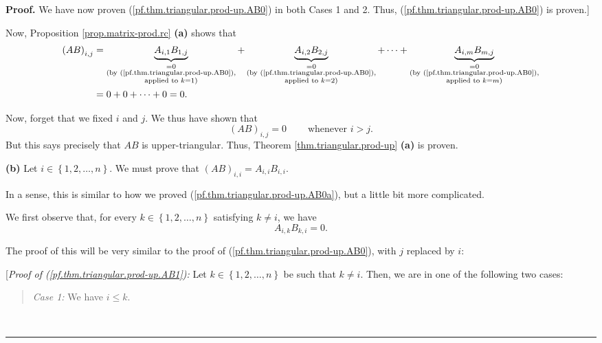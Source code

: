 \documentclass[numbers=enddot,12pt,final,onecolumn,notitlepage]{scrartcl}%
\theoremstyle{definition}
\newenvironment{statement}{\begin{quote}}{\end{quote}}
\newenvironment{proof}[1][Proof]{\noindent\textbf{#1.} }{\ \rule{0.5em}{0.5em}}
\begin{document}
\begin{proof}
We have now proven (\ref{pf.thm.triangular.prod-up.AB0}) in both Cases 1 and
2. Thus, (\ref{pf.thm.triangular.prod-up.AB0}) is proven.]

Now, Proposition \ref{prop.matrix-prod.rc} \textbf{(a)} shows that%
\begin{align*}
\left(  AB\right)  _{i,j}  &  =\underbrace{A_{i,1}B_{1,j}}%
_{\substack{=0\\\text{(by (\ref{pf.thm.triangular.prod-up.AB0}),}%
\\\text{applied to }k=1\text{)}}}+\underbrace{A_{i,2}B_{2,j}}%
_{\substack{=0\\\text{(by (\ref{pf.thm.triangular.prod-up.AB0}),}%
\\\text{applied to }k=2\text{)}}}+\cdots+\underbrace{A_{i,m}B_{m,j}%
}_{\substack{=0\\\text{(by (\ref{pf.thm.triangular.prod-up.AB0}),}%
\\\text{applied to }k=m\text{)}}}\\
&  =0+0+\cdots+0=0.
\end{align*}


Now, forget that we fixed $i$ and $j$. We thus have shown that%
\begin{equation}
\left(  AB\right)  _{i,j}=0\ \ \ \ \ \ \ \ \ \ \text{whenever }i>j.
\label{pf.thm.triangular.prod-up.AB0a}%
\end{equation}
But this says precisely that $AB$ is upper-triangular. Thus, Theorem
\ref{thm.triangular.prod-up} \textbf{(a)} is proven.

\textbf{(b)} Let $i\in\left\{  1,2,\ldots,n\right\}  $. We must prove that
$\left(  AB\right)  _{i,i}=A_{i,i}B_{i,i}$.

In a sense, this is similar to how we proved
(\ref{pf.thm.triangular.prod-up.AB0a}), but a little bit more complicated.

We first observe that, for every $k\in\left\{  1,2,\ldots,n\right\}  $
satisfying $k\neq i$, we have%
\begin{equation}
A_{i,k}B_{k,i}=0. \label{pf.thm.triangular.prod-up.AB1}%
\end{equation}


The proof of this will be very similar to the proof of
(\ref{pf.thm.triangular.prod-up.AB0}), with $j$ replaced by $i$:

[\textit{Proof of (\ref{pf.thm.triangular.prod-up.AB1}):} Let $k\in\left\{
1,2,\ldots,n\right\}  $ be such that $k\neq i$. Then, we are in one of the
following two cases:

\begin{statement}
\textit{Case 1:} We have $i\leq k$.
\end{statement}


\end{proof}
\end{document}
